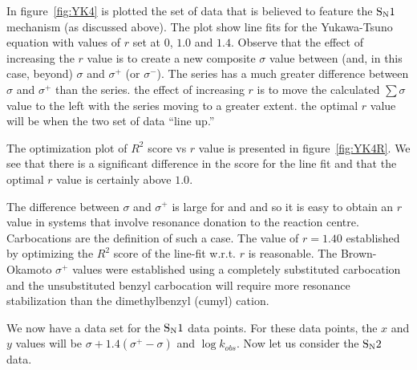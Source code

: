 \documentclass{tufte-handout}
\begin{document}
In figure~\vref{fig:YK4} is plotted the set of data that is believed to feature the $\rm S_N1$ mechanism (as discussed above). The plot show line fits for the Yukawa-Tsuno equation with values of $r$ set at $0$, $1.0$ and $1.4$. Observe that the effect of increasing the $r$ value is to create a new composite $\sigma$ value between (and, in this case, beyond) $\sigma$ and $\sigma^+$ (or $\sigma^-$). The  series has a much greater difference between $\sigma$ and $\sigma^+$ than the  series. the effect of increasing $r$ is to move the calculated $\sum \sigma$ value to the left with the  series moving to a greater extent. the optimal $r$ value will be when the two set of data ``line up.''

The optimization plot of $R^2$ score vs $r$ value is presented in figure~\vref{fig:YK4R}. We see that there is a significant difference in the score for the line fit and that the optimal $r$ value is certainly above $1.0$.

The difference between $\sigma$ and $\sigma^+$ is large for  and  and so it is easy to obtain an $r$ value in systems that involve resonance donation to the reaction centre. Carbocations are the definition of such a case. The value of $r = 1.40$ established by optimizing the $R^2$ score of the line-fit w.r.t. $r$ is reasonable. The Brown-Okamoto $\sigma^+$ values were established using a completely substituted carbocation and the unsubstituted benzyl carbocation will require more resonance stabilization than the dimethylbenzyl (cumyl) cation.

We now have a data set for the $\rm S_N1$ data points. For these data points, the $x$ and $y$ values will be $\sigma + 1.4 \left(\sigma^+ - \sigma \right)$ and $\log{k_{obs}}$. Now let us consider the $\rm S_N2$ data.
\end{document}
